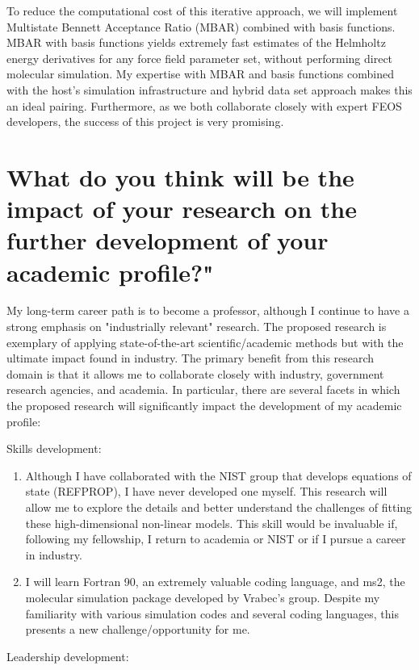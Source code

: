 \documentclass[12pt]{article}
\begin{document}
	To reduce the computational cost of this iterative approach, we will implement Multistate Bennett Acceptance Ratio (MBAR) combined with basis functions. MBAR with basis functions yields extremely fast estimates of the Helmholtz energy derivatives for any force field parameter set, without performing direct molecular simulation. My expertise with MBAR and basis functions combined with the host's simulation infrastructure and hybrid data set approach makes this an ideal pairing. Furthermore, as we both collaborate closely with expert FEOS developers, the success of this project is very promising.
	
	\section*{What do you think will be the impact of your research on the further development of your academic profile?"}
	
	My long-term career path is to become a professor, although I continue to have a strong emphasis on "industrially relevant" research. The proposed research is exemplary of applying state-of-the-art scientific/academic methods but with the ultimate impact found in industry. The primary benefit from this research domain is that it allows me to collaborate closely with industry, government research agencies, and academia. In particular, there are several facets in which the proposed research will significantly impact the development of my academic profile:
	
	Skills development:
	
	\begin{enumerate}
		\item Although I have collaborated with the NIST group that develops equations of state (REFPROP), I have never developed one myself. This research will allow me to explore the details and better understand the challenges of fitting these high-dimensional non-linear models. This skill would be invaluable if, following my fellowship, I return to academia or NIST or if I pursue a career in industry.
		\item I will learn Fortran 90, an extremely valuable coding language, and ms2, the molecular simulation package developed by Vrabec's group. Despite my familiarity with various simulation codes and several coding languages, this presents a new challenge/opportunity for me.
	\end{enumerate}
	
	Leadership development:
	
\end{document}
